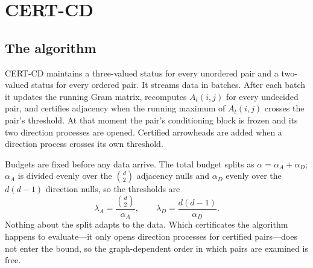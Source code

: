 
\section{CERT-CD}\label{sec:algorithm}

\subsection{The algorithm}\label{sec:algo-desc}

CERT-CD maintains a three-valued status for every unordered pair and a
two-valued status for every ordered pair. It streams data in batches. After
each batch it updates the running Gram matrix, recomputes $A_t(i,j)$ for every
undecided pair, and certifies adjacency when the running maximum of $A_t(i,j)$
crosses the pair's threshold. At that moment the pair's conditioning block is
frozen and its two direction processes are opened. Certified arrowheads are
added when a direction process crosses its own threshold.

Budgets are fixed before any data arrive. The total budget splits as
$\alpha = \alpha_A + \alpha_D$; $\alpha_A$ is divided evenly over the
$\binom{d}{2}$ adjacency nulls and $\alpha_D$ evenly over the $d(d-1)$
direction nulls, so the thresholds are
\begin{equation}\label{eq:thresholds}
\lambda_A = \frac{\binom{d}{2}}{\alpha_A},
\qquad
\lambda_D = \frac{d(d-1)}{\alpha_D}.
\end{equation}
Nothing about the split adapts to the data. Which certificates the algorithm
happens to evaluate---it only opens direction processes for certified
pairs---does not enter the bound, so the graph-dependent order in which pairs
are examined is free.

